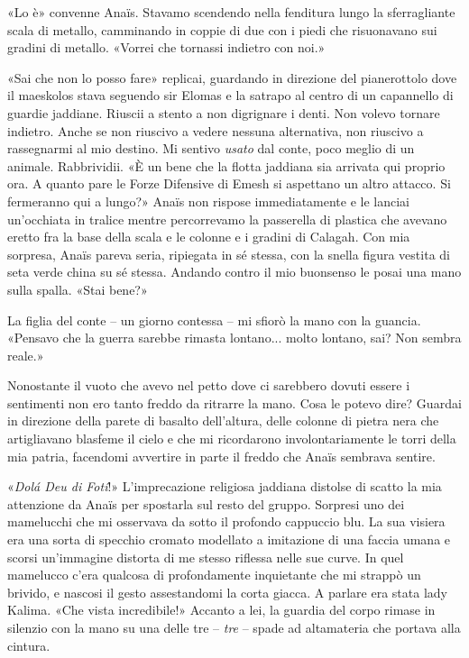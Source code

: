 «Lo è» convenne Anaïs. Stavamo scendendo nella fenditura lungo la
sferragliante scala di metallo, camminando in coppie di due con i piedi
che risuonavano sui gradini di metallo. «Vorrei che tornassi indietro
con noi.»

«Sai che non lo posso fare» replicai, guardando in direzione del
pianerottolo dove il maeskolos stava seguendo sir Elomas e la satrapo al
centro di un capannello di guardie jaddiane. Riuscii a stento a non
digrignare i denti. Non volevo tornare indietro. Anche se non riuscivo a
vedere nessuna alternativa, non riuscivo a rassegnarmi al mio destino.
Mi sentivo \emph{usato} dal conte, poco meglio di un animale.
Rabbrividii. «È un bene che la flotta jaddiana sia arrivata qui proprio
ora. A quanto pare le Forze Difensive di Emesh si aspettano un altro
attacco. Si fermeranno qui a lungo?» Anaïs non rispose immediatamente e
le lanciai un'occhiata in tralice mentre percorrevamo la passerella di
plastica che avevano eretto fra la base della scala e le colonne e i
gradini di Calagah. Con mia sorpresa, Anaïs pareva seria, ripiegata in
sé stessa, con la snella figura vestita di seta verde china su sé
stessa. Andando contro il mio buonsenso le posai una mano sulla spalla.
«Stai bene?»

La figlia del conte -- un giorno contessa -- mi sfiorò la mano con la
guancia. «Pensavo che la guerra sarebbe rimasta lontano... molto
lontano, sai? Non sembra reale.»

Nonostante il vuoto che avevo nel petto dove ci sarebbero dovuti essere
i sentimenti non ero tanto freddo da ritrarre la mano. Cosa le potevo
dire? Guardai in direzione della parete di basalto dell'altura, delle
colonne di pietra nera che artigliavano blasfeme il cielo e che mi
ricordarono involontariamente le torri della mia patria, facendomi
avvertire in parte il freddo che Anaïs sembrava sentire.

«\emph{Dolá Deu di Fotí}!» L'imprecazione religiosa jaddiana distolse di
scatto la mia attenzione da Anaïs per spostarla sul resto del gruppo.
Sorpresi uno dei mamelucchi che mi osservava da sotto il profondo
cappuccio blu. La sua visiera era una sorta di specchio cromato
modellato a imitazione di una faccia umana e scorsi un'immagine distorta
di me stesso riflessa nelle sue curve. In quel mamelucco c'era qualcosa
di profondamente inquietante che mi strappò un brivido, e nascosi il
gesto assestandomi la corta giacca. A parlare era stata lady Kalima.
«Che vista incredibile!» Accanto a lei, la guardia del corpo rimase in
silenzio con la mano su una delle tre -- \emph{tre} -- spade ad
altamateria che portava alla cintura.

